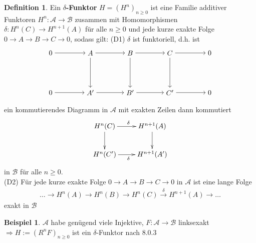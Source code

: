 \documentclass[10pt,a4paper,numbers=endperiod]{scrreprt}
\theoremstyle{definition}
\newtheorem{defi}[satz]{Definition}
\newtheorem{bsp}[satz]{Beispiel}
\begin{document}
\begin{defi}
	Ein \textbf{$\delta$-Funktor} $H = (H^n)_{n \geq 0}$ ist eine Familie additiver Funktoren $H^n: \mathcal{A} \to \mathcal{B}$ zusammen mit Homomorphismen $\delta: H^n(C) \to H^{n+1}(A)$ für alle $n \geq 0$ und jede kurze exakte Folge\\
	$0 \to A \to B \to C \to 0$, sodass gilt: 
	(D1) $\delta$ ist funktoriell, d.h. ist \begin{align*}
	\begin{tikzpicture}{
		\node (30) at (1,2) {$0$};
		\node (31) at (3,2) {$ A $};
		\node (32) at (5,2) {$ B $};
		\node (33) at (7,2) {$ C $};
		\node (34) at (9,2) {$ 0 $};
		\node (40) at (1,0) {$ 0 $};
		\node (41) at (3,0) {$ A' $};
		\node (42) at (5,0) {$ B' $};
		\node (43) at (7,0) {$ C' $};
		\node (44) at (9,0) {$ 0 $};
		\draw[->] (30) edge (31);
		\draw[->] (31) edge (32);
		\draw[->] (32) edge (33);
		\draw[->] (33) edge (34);
		\draw[->] (40) edge (41);
		\draw[->] (41) edge (42);
		\draw[->] (42) edge (43);
		\draw[->] (43) edge (44);
		\draw[->] (31) edge (41);
		\draw[->] (32) edge (42);
		\draw[->] (33) edge (43);}
	\end{tikzpicture}
	\end{align*}
	ein kommutierendes Diagramm in $\mathcal{A}$ mit exakten Zeilen dann kommutiert \begin{align*}
	\begin{xy}
	\xymatrix{
		H^n(C) \ar[r]^{\delta} \ar[d]   &   H^{n+1}(A) \ar[d]\\
		H^n(C') \ar[r]_{\delta} & H^{n+1}(A') 
	}
	\end{xy}
	\end{align*}
	in $\mathcal{B}$ für alle $n \geq 0$.\\
	(D2) Für jede kurze exakte Folge $0 \to A \to B \to C \to 0$ in $\mathcal{A}$ ist eine lange Folge \begin{align*}
	\ldots \longrightarrow H^n(A) \longrightarrow H^n(B) \longrightarrow H^n(C) \overset{\delta}{\longrightarrow} H^{n+1}(A) \longrightarrow \ldots
	\end{align*}
	exakt in $\mathcal{B}$
\end{defi}

\begin{bsp}
	$\mathcal{A}$ habe genügend  viele Injektive, $F: \mathcal{A} \to \mathcal{B}$ linksexakt\\
	$\Rightarrow H:= (R^nF)_{n \geq 0}$ ist ein $\delta$-Funktor nach 8.0.3
\end{bsp}
\end{document}
